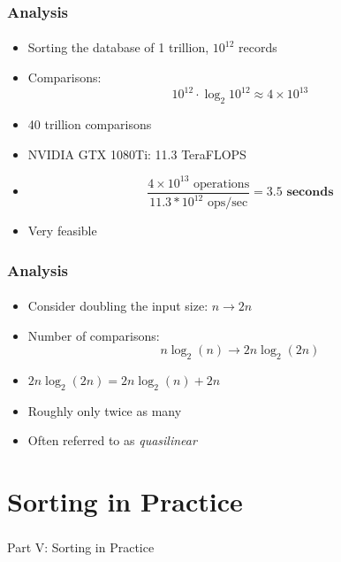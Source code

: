 \documentclass[]{beamer}
\begin{document}
\begin{frame}[fragile]
  \frametitle{Analysis}
  \framesubtitle{}

\begin{itemize}[<+->]
  \item Sorting the database of 1 trillion, $10^{12}$ records
  \item Comparisons:
    $$10^{12} \cdot \log_2{10^{12}} \approx 4 \times 10^{13}$$
  \item 40 trillion comparisons
  \item NVIDIA GTX 1080Ti: 11.3 TeraFLOPS
  \item[~]
    $$\frac{4 \times 10^{13} \textrm{ operations}}{11.3 * 10^{12} \textrm{ ops/sec}} = 3.5 \textbf{ seconds}$$
  \item Very feasible
\end{itemize}  
  
\end{frame}

\begin{frame}[fragile]
  \frametitle{Analysis}
  \framesubtitle{}  

\begin{itemize}[<+->]
  \item Consider doubling the input size: $n \rightarrow 2n$
  \item Number of comparisons:
   $$n\log_2{(n)} \rightarrow 2n\log_2{(2n)}$$
  \item $2n\log_2{(2n)} = 2n\log_2{(n)} + 2n$
  \item Roughly only twice as many
  \item Often referred to as \emph{quasilinear}
\end{itemize}

\end{frame}

\section{Sorting in Practice}

\begin{frame}
    \frametitle{}
    \framesubtitle{}
    
    \begin{center}
    {\Huge Part V: Sorting in Practice}\\
    {\Large ~}
    \end{center}

\end{frame}
\end{document}
